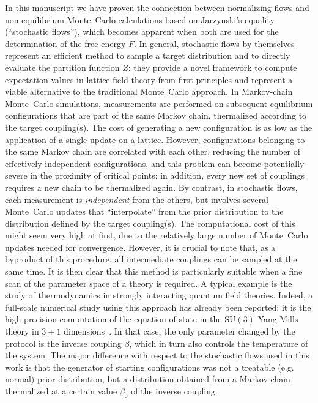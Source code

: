 \documentclass[11pt]{article}
\newcommand{\SU}{\mathrm{SU}}
\begin{document}
In this manuscript we have proven the connection between normalizing flows and non-equilibrium Monte~Carlo calculations based on Jarzynski's equality (``stochastic flows''), which becomes apparent when both are used for the determination of the free energy $F$. In general, stochastic flows by themselves represent an efficient method to sample a target distribution and to directly evaluate the partition function $Z$: they provide a novel framework to compute expectation values in lattice field theory from first principles and represent a viable alternative to the traditional Monte~Carlo approach. In Markov-chain Monte~Carlo simulations, measurements are performed on subsequent equilibrium configurations that are part of the same Markov chain, thermalized according to the target coupling(s). The cost of generating a new configuration is as low as the application of a single update on a lattice. However, configurations belonging to the same Markov chain are correlated with each other, reducing the number of effectively independent configurations, and this problem can become potentially severe in the proximity of critical points; in addition, every new set of couplings requires a new chain to be thermalized again. By contrast, in stochastic flows, each measurement is \emph{independent} from the others, but involves several Monte~Carlo updates that ``interpolate'' from the prior distribution to the distribution defined by the target coupling(s). The computational cost of this might seem very high at first, due to the relatively large number of Monte~Carlo updates needed for convergence. However, it is crucial to note that, as a byproduct of this procedure, all intermediate couplings can be sampled at the same time. It is then clear that this method is particularly suitable when a fine scan of the parameter space of a theory is required. A typical example is the study of thermodynamics in strongly interacting quantum field theories. Indeed, a full-scale numerical study using this approach has already been reported: it is the high-precision computation of the equation of state in the $\SU(3)$ Yang-Mills theory in $3+1$ dimensions~\cite{Caselle:2018kap}. In that case, the only parameter changed by the protocol is the inverse coupling $\beta$, which in turn also controls the temperature of the system. The major difference with respect to the stochastic flows used in this work is that the generator of starting configurations was not a treatable (e.g. normal) prior distribution, but a distribution obtained from a Markov chain thermalized at a certain value $\beta_0$ of the inverse coupling.
\end{document}
